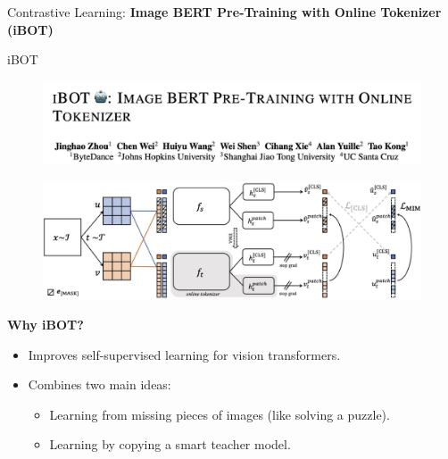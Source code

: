 \begin{frame}{}
    \LARGE Contrastive Learning: \textbf{Image BERT Pre-Training with Online Tokenizer (iBOT)}
\end{frame}


\begin{frame}[allowframebreaks]{iBOT}
\begin{figure}
    \centering
    \includegraphics[width=\linewidth,height=0.9\textheight,keepaspectratio]{images/contrastive/slide_91_2_img.png}
\end{figure}
    \begin{figure}
    \centering
    \includegraphics[width=\linewidth,height=0.9\textheight,keepaspectratio]{images/contrastive/slide_91_1_img.png}
\end{figure}

\framebreak

\textbf{Why iBOT?}
\begin{itemize}
    \item Improves self-supervised learning for vision transformers.
    \item Combines two main ideas:
    \begin{itemize}
        \item Learning from missing pieces of images (like solving a puzzle).
        \item Learning by copying a smart teacher model.
    \end{itemize}
\end{itemize}

\framebreak


\end{frame}

